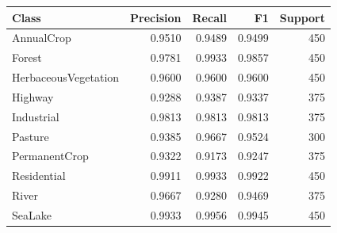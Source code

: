 \begin{tabular}{lrrrr}
\toprule
Class & Precision & Recall & F1 & Support \\
\midrule
AnnualCrop & 0.9510 & 0.9489 & 0.9499 & 450 \\
Forest & 0.9781 & 0.9933 & 0.9857 & 450 \\
HerbaceousVegetation & 0.9600 & 0.9600 & 0.9600 & 450 \\
Highway & 0.9288 & 0.9387 & 0.9337 & 375 \\
Industrial & 0.9813 & 0.9813 & 0.9813 & 375 \\
Pasture & 0.9385 & 0.9667 & 0.9524 & 300 \\
PermanentCrop & 0.9322 & 0.9173 & 0.9247 & 375 \\
Residential & 0.9911 & 0.9933 & 0.9922 & 450 \\
River & 0.9667 & 0.9280 & 0.9469 & 375 \\
SeaLake & 0.9933 & 0.9956 & 0.9945 & 450 \\
\bottomrule
\end{tabular}
